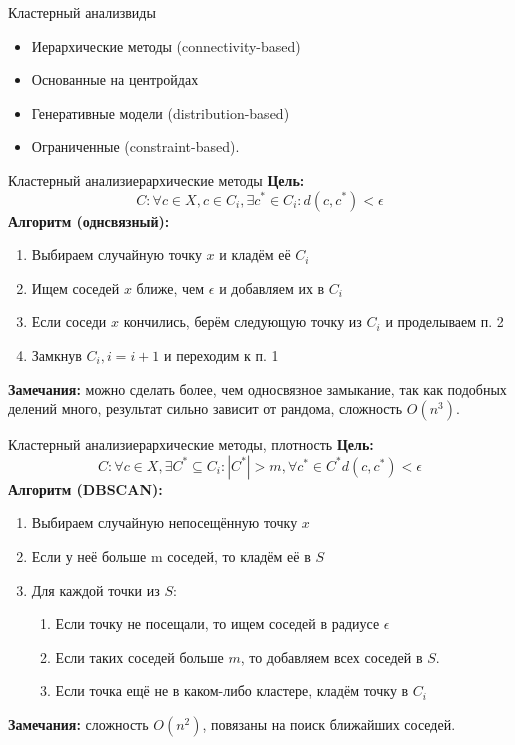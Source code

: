 \documentclass[14pt, fleqn, xcolor={dvipsnames, table}]{beamer}
\begin{document}
\begin{frame}{Кластерный анализ}{виды}
\begin{itemize}
  \item Иерархические методы (connectivity-based)
  \item Основанные на центройдах
  \item Генеративные модели (distribution-based)
  \item Ограниченные (constraint-based).
\end{itemize}
\end{frame}



\begin{frame}{Кластерный анализ}{иерархические методы}
\small
\textbf{Цель:}
$$
  C: \forall c \in X, c \in C_i, \exists c^* \in C_i : d(c, c^*) < \epsilon
$$
\textbf{Алгоритм (однсвязный):}
\begin{enumerate}
  \item Выбираем случайную точку $x$ и кладём её $C_i$
  \item Ищем соседей $x$ ближе, чем $\epsilon$ и добавляем их в $C_i$
  \item Если соседи $x$ кончились, берём следующую точку из $C_i$ и проделываем п. 2
  \item Замкнув $C_i, i = i+1$ и переходим к п. 1
\end{enumerate}
\textbf{Замечания:} можно сделать более, чем односвязное замыкание, так как подобных делений много, результат сильно зависит от рандома, сложность $O(n^3)$.
\end{frame}




\begin{frame}{Кластерный анализ}{иерархические методы, плотность}
\small
\textbf{Цель:}
$$
  C: \forall c \in X, \exists C^* \subseteq C_i: |C^*| > m, \forall c^* \in C^* d(c, c^*) < \epsilon
$$
\textbf{Алгоритм (DBSCAN):}
\begin{enumerate}
  \item Выбираем случайную непосещённую точку $x$
  \item Если у  неё больше m соседей, то кладём её в $S$
  \item Для каждой точки из $S$:
  \begin{enumerate}
    \item Если точку не посещали, то ищем соседей в радиусе $\epsilon$
    \item Если таких соседей больше $m$, то добавляем всех соседей в $S$. 
    \item Если точка ещё не в каком-либо кластере, кладём точку в $C_i$
    
  \end{enumerate}
  
\end{enumerate}
\textbf{Замечания:} сложность $O(n^2)$, повязаны на поиск ближайших соседей.
\end{frame}
\end{document}
